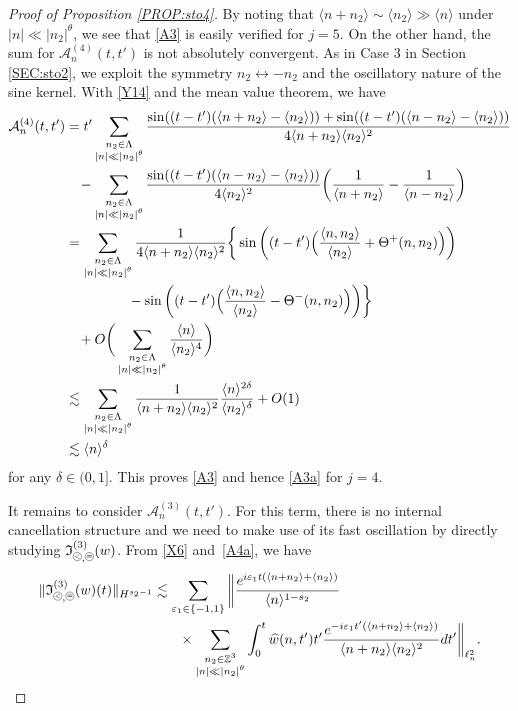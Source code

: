 \documentclass[%
11pt,  reqno]{amsart}
\newcommand{\pe}{\mathbin{\scaleobj{0.7}{\tikz \draw (0,0) node[shape=circle,draw,inner sep=0pt,minimum size=8.5pt] {\scriptsize  $=$};}}}
\newcommand{\pl}{\mathbin{\scaleobj{0.7}{\tikz \draw (0,0) node[shape=circle,draw,inner sep=0pt,minimum size=8.5pt] {\scriptsize $<$};}}}
\newcommand{\1}{\hspace{0.2mm}\text{I}\hspace{0.2mm}}
\newcommand{\Z}{\mathbb{Z}}
\newcommand{\dl}{\delta}
\newcommand{\eps}{\varepsilon}
\newcommand{\Ld}{\Lambda}
\newcommand{\ft}{\widehat}
\renewcommand{\l}{\ell}
\newcommand{\les}{\lesssim}
\newcommand{\jb}[1]
{\langle #1 \rangle}
\newcommand{\If}{\mathfrak{I}}
\newcommand{\A}{\mathcal{A}}
\numberwithin{equation}{section}
\numberwithin{theorem}{section}
\begin{document}
\begin{proof}[Proof of Proposition \ref{PROP:sto4}]
By noting that $\jb{n+n_2} \sim \jb{n_2}\gg \jb{n}$
under $ |n| \ll |n_2|^\theta$, 
we see that \eqref{A3} is easily verified for $j = 5$.
On the other hand, 
  the sum for $\A^{(4)}_{n} (t, t')$ 
is not absolutely convergent.
As in Case 3 in Section \ref{SEC:sto2}, 
we exploit the symmetry $n_2 \leftrightarrow -n_2$
and the oscillatory nature of the sine kernel.
With \eqref{Y14} and the mean value theorem, we have
\begin{align}
\begin{split}
 \A^{(4)}_{n} (t, t')
& = t'    \sum_{\substack{n_2 \in \Ld \\ |n| \ll |n_2|^\theta}}
 \frac{\sin ((t - t')( \jb{n + n_2 }- \jb{n_2}))
 + \sin ((t - t')( \jb{n - n_2 }- \jb{n_2}) )}{4\jb{ n + n_2} \jb{n_2}^2}  \\
& \hphantom{X}
- \sum_{\substack{n_2 \in \Ld \\ |n| \ll |n_2|^\theta}}
 \frac{  \sin ((t - t')( \jb{n - n_2 }- \jb{n_2}) )}{4 \jb{n_2}^2}
 \bigg(\frac{1}{\jb{ n + n_2}} - \frac{1}{\jb{ n - n_2}}\bigg)
 \\
& =    \sum_{\substack{n_2 \in \Ld \\ |n| \ll |n_2|^\theta}}
 \frac{1}{4\jb{ n + n_2} \jb{n_2}^2} 
 \bigg\{
\sin \bigg((t - t')\Big(  \frac{\jb{n, n_2}}{\jb{n_2}} + \Theta^+(n, n_2)\Big)\bigg)\\
& \hphantom{XXXXX}
- \sin \bigg((t - t')\Big(  \frac{\jb{n, n_2}}{\jb{n_2}} - \Theta^-(n, n_2)\Big)\bigg)
 \bigg\} 
\\
& \hphantom{X}
 +   O\bigg(  \sum_{\substack{n_2 \in \Ld \\ |n| \ll |n_2|^\theta}}
 \frac{ \jb{n}}{\jb{n_2}^4}\bigg)\\
 & \les   \sum_{\substack{n_2 \in \Ld \\ |n| \ll |n_2|^\theta}}
 \frac{1}{\jb{ n + n_2} \jb{n_2}^2} 
\frac{\jb{n}^{2\dl}}{\jb{n_2}^\dl} + O(1)\\
& \les \jb{n}^\dl
\end{split}
\label{A4}
\end{align}
for any $\dl \in (0, 1]$.
This proves \eqref{A3} and hence \eqref{A3a}
for $j = 4$.

It remains to consider 
$ \A^{(3)}_{n} (t, t')$.
For this term, there is no internal cancellation structure
and we need to make use of its fast oscillation
by directly studying $\If_{\pl, \pe}^{(3)}(w)$.
From  \eqref{X6} and~\eqref{A4a},  we have
\begin{align}
\begin{split}
\|\If_{\pl, \pe}^{(3)}(w) (t)\|_{H^{s_2 - 1}}
&  \les 
\sum_{\eps_1 \in \{-1, 1\}}
\bigg\|
\frac{e^{i \eps_1 t ( \jb{n + n_2 }+ \jb{n_2})}}{\jb{n}^{1-s_2}} \\
& \hphantom{XX}
\times\sum_{\substack{n_2 \in \Z^3 \\ |n| \ll |n_2|^\theta}}
    \int_0^{t} 
\ft w(n, t')
t'    \frac{e^{ - i \eps_1   t'( \jb{n + n_2 }+ \jb{n_2})}}{ \jb{ n + n_2} \jb{n_2}^2} dt'\bigg\|_{\l^2_n}.
\end{split}
\label{A6}
\end{align}



\end{proof}
\end{document}
